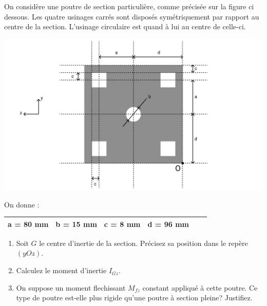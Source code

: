 \documentclass[lecture.tex]{subfiles}
\begin{document}
\exercice{}

On considère une poutre de section particulière, comme précisée sur la figure ci dessous. Les quatre usinages carrés sont disposés symétriquement par rapport au centre de la section. L'usinage circulaire est quand à lui au centre de celle-ci.

\begin{center}
  \includegraphics[width=\textwidth]{figA0024.pdf}
\end{center}

\medskip

On donne :

\begin{center}
  \begin{tabular}{|l|l|l|l|l|l|}
    \hline
    a = 80 mm & b = 15 mm & c = 8 mm & d = 96 mm \\
    \hline
  \end{tabular}
\end{center}

\medskip

\begin{enumerate}
  \item Soit $G$ le centre d'inertie de la section. Précisez sa position dans le repère $(yOz)$.
  \item Calculez le moment d'inertie $I_{Gz}$.
  \item On suppose un moment flechissant $M_{fz}$ constant appliqué à cette poutre. Ce type de poutre est-elle plus rigide qu'une poutre à section pleine? Justifiez.
\end{enumerate}

\finexercice
\end{document}
